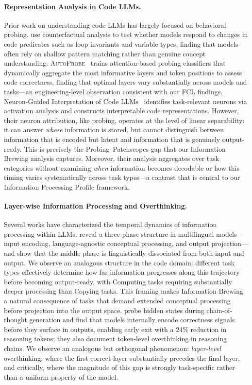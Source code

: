 \paragraph{Representation Analysis in Code LLMs.}
Prior work on understanding code LLMs has largely focused on behavioral probing.
\citet{hooda2024counterfactual} use counterfactual analysis to test whether models respond to changes in code predicates such as loop invariants and variable types, finding that models often rely on shallow pattern matching rather than genuine concept understanding.
\textsc{AutoProbe}~\citep{autoprobe2025} trains attention-based probing classifiers that dynamically aggregate the most informative layers and token positions to assess code correctness, finding that optimal layers vary substantially across models and tasks---an engineering-level observation consistent with our FCL findings.
Neuron-Guided Interpretation of Code LLMs~\citep{neuronguided2026} identifies task-relevant neurons via activation analysis and constructs interpretable code representations.
However, their neuron attribution, like probing, operates at the level of linear separability: it can answer \emph{where} information is stored, but cannot distinguish between information that is encoded but latent and information that is genuinely output-ready.
This is precisely the Probing--Patchscopes gap that our Information Brewing analysis captures.
Moreover, their analysis aggregates over task categories without examining \emph{when} information becomes decodable or how this timing varies systematically across task types---a contrast that is central to our Information Processing Profile framework.

\paragraph{Layer-wise Information Processing and Overthinking.}
Several works have characterized the temporal dynamics of information processing within LLMs.
\citet{wendler2024llamas} reveal a three-phase structure in multilingual models---input encoding, language-agnostic conceptual processing, and output projection---and show that the middle phase is linguistically dissociated from both input and output.
We observe an analogous structure in the code domain: different task types effectively determine how far information progresses along this trajectory before becoming output-ready, with Computing tasks requiring substantially deeper processing than Copying tasks.
This framing makes Information Brewing a natural consequence of tasks that demand extended conceptual processing before projection into the output space.
\citet{selfverify2025} probe hidden states during chain-of-thought generation and find that models internally encode correctness signals before they surface in outputs, enabling early exit with a 24\% reduction in reasoning tokens; they also document token-level overthinking in reasoning chains.
We observe an analogous but orthogonal phenomenon: \emph{layer-level} overthinking, where the first correct layer substantially precedes the final layer, and critically, where the magnitude of this gap is strongly task-specific rather than a uniform property of the model.

